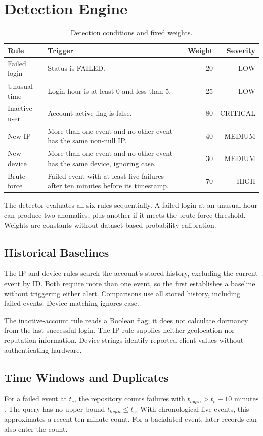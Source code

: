 \section{Detection Engine}
\begin{table}[htbp]\centering\small\caption{Detection conditions and fixed weights.}\label{tab:rules}
\begin{tabularx}{\textwidth}{lYrr}\toprule Rule & Trigger & Weight & Severity\\\midrule
Failed login & Status is FAILED. & 20 & LOW\\
Unusual time & Login hour is at least 0 and less than 5. & 25 & LOW\\
Inactive user & Account active flag is false. & 80 & CRITICAL\\
New IP & More than one event and no other event has the same non-null IP. & 40 & MEDIUM\\
New device & More than one event and no other event has the same device, ignoring case. & 30 & MEDIUM\\
Brute force & Failed event with at least five failures after ten minutes before its timestamp. & 70 & HIGH\\\bottomrule\end{tabularx}\end{table}

The detector evaluates all six rules sequentially. A failed login at an unusual hour can produce two anomalies, plus another if it meets the brute-force threshold. Weights are constants without dataset-based probability calibration.

\subsection{Historical Baselines}
The IP and device rules search the account's stored history, excluding the current event by ID. Both require more than one event, so the first establishes a baseline without triggering either alert. Comparisons use all stored history, including failed events. Device matching ignores case.

The inactive-account rule reads a Boolean flag; it does not calculate dormancy from the last successful login. The IP rule supplies neither geolocation nor reputation information. Device strings identify reported client values without authenticating hardware.

\subsection{Time Windows and Duplicates}
For a failed event at $t_e$, the repository counts failures with $t_{login}>t_e-10\text{ minutes}$. The query has no upper bound $t_{login}\leq t_e$. With chronological live events, this approximates a recent ten-minute count. For a backdated event, later records can also enter the count.

